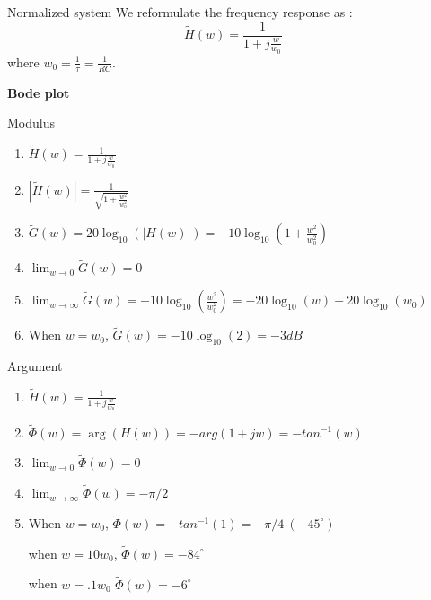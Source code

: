   \begin{block}{Normalized system}
    We reformulate the frequency response as :
\begin{equation}
\label{eq:fobnctransfert_w0}
\tilde H(w)=\frac{1}{1+j\frac{w}{w_0}}
\end{equation}
where $w_0=\frac{1}{\tau}=\frac{1}{RC}$. 
  \end{block}
\textbf{Bode plot}
    \begin{block}{Modulus}\pause
\begin{enumerate}
\item $\tilde H(w)={\frac{1}{1+j\frac{w}{w_0}}}$
\item  $|\tilde H(w)|={\frac{1}{\sqrt{1+\frac{w^2}{w_0^2}}}}$
\item  $\tilde G(w)={20\log_{10}(|H(w)|)=-10\log_{10}(1+\frac{w^2}{w_0^2})}$
\item $\lim_{w\rightarrow 0}
\tilde G(w)={0}$
\item 
$\lim_{w\rightarrow\infty} \tilde G(w)={-10\log_{10}(\frac{w^2}{w_0^2})=-20\log_{10}(w)+20\log_{10}(w_0)}$
\item When $w=w_0$, $\tilde G(w)={-10\log_{10}(2)=-3dB}$
\end{enumerate}
    \end{block}

    \begin{block}{Argument}%
        \begin{enumerate}
        \item $\tilde H(w)={\frac{1}{1+j\frac{w}{w_0}}}$
        \item $\tilde \Phi(w)={\arg(H(w))=-arg(1+jw)=-tan^{-1}(w)}$
        \item  $\lim_{w\rightarrow 0}
        \tilde  \Phi(w)={0}$
        \item   $\lim_{w\rightarrow\infty}\tilde \Phi(w)={-\pi/2}$
        \item  When $w=w_0$, $\tilde \Phi(w)={-tan^{-1}(1)=-\pi/4 \ (-45^\circ)}$
        
        when  $w=10w_0$,
          $\tilde \Phi(w)={-84^\circ}$
        
        when $w=.1w_0$
          $\tilde \Phi(w)={-6^\circ}$
        \end{enumerate}
              \end{block}

